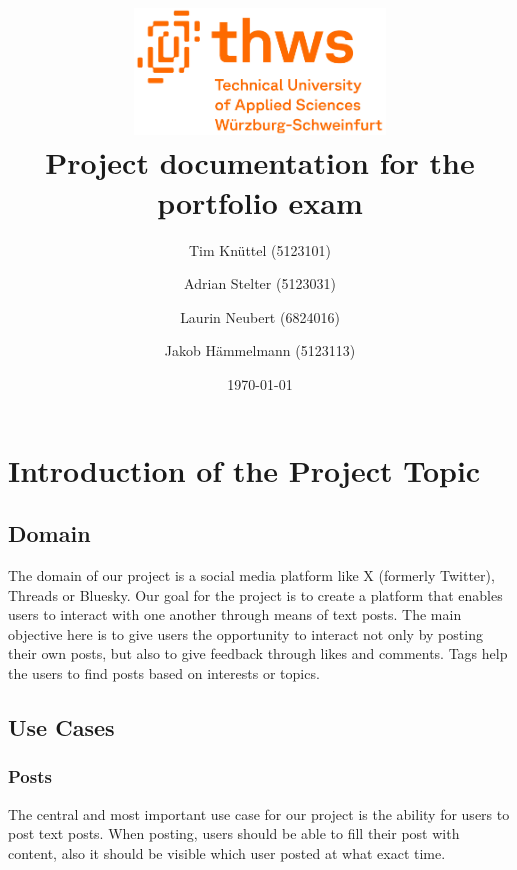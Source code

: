 \documentclass[a4paper, 11pt]{article}
\begin{document}
    \title{\vspace{-3cm}\includegraphics[width=0.5\textwidth]{thws}\\ Project documentation for the portfolio exam}
    \date{\today}
    \author{Tim Knüttel (5123101) \and Adrian Stelter (5123031) \and Laurin Neubert (6824016) \and Jakob Hämmelmann (5123113)}



    \maketitle


    \section{Introduction of the Project Topic}\label{sec:introduction-of-the-project-topic}

    \subsection{Domain}\label{subsec:domain}
    The domain of our project is a social media platform like X (formerly Twitter), Threads or Bluesky.
    Our goal for the project is to create a platform that enables users to interact with one another through means of text posts.
    The main objective here is to give users the opportunity to interact not only by posting their own posts, but also to give feedback through likes and comments.
    Tags help the users to find posts based on interests or topics.

    \subsection{Use Cases}\label{subsec:use-cases}

    \subsubsection{Posts}
    The central and most important use case for our project is the ability for users to post text posts. When posting, users should be able to fill their post with content, also it should be visible which user posted at what exact time.
\end{document}
